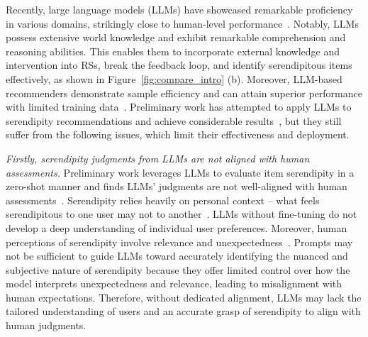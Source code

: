 


Recently, large language models (LLMs) 
have showcased remarkable proficiency in various domains, strikingly close to human-level performance~\cite{bubeck2023sparks,achiam2023gpt}. Notably, LLMs possess extensive world knowledge and exhibit remarkable comprehension and reasoning abilities. This enables them to incorporate external knowledge and intervention into RSs, break the feedback loop, and identify serendipitous items effectively, as shown in Figure~\ref{fig:compare_intro} (b). Moreover, LLM-based recommenders demonstrate sample efficiency and can attain superior performance with limited training data~\cite{lin2025large}. Preliminary work has attempted to apply LLMs to serendipity recommendations and achieve considerable results~\cite{tokutake2024can,fu2024art}, but they still suffer from the following issues, which limit their effectiveness and deployment.


\textit{Firstly, serendipity judgments from LLMs are not aligned with human assessments.} Preliminary work leverages LLMs to evaluate item serendipity in a zero-shot manner and finds LLMs' judgments are not well-aligned with human assessments~\cite{tokutake2024can}. Serendipity relies heavily on personal context -- what feels serendipitous to one user may not to another~\cite{kotkov2024overview}. LLMs without fine-tuning do not develop a deep understanding of individual user preferences. Moreover, human perceptions of serendipity involve relevance and unexpectedness~\cite{fu2023deep}. Prompts may not be sufficient to guide LLMs toward accurately identifying the nuanced and subjective nature of serendipity because they offer limited control over how the model interprets unexpectedness and relevance, leading to misalignment with human expectations. Therefore, without dedicated alignment, LLMs may lack the tailored understanding of users and an accurate grasp of serendipity to align with human judgments.

